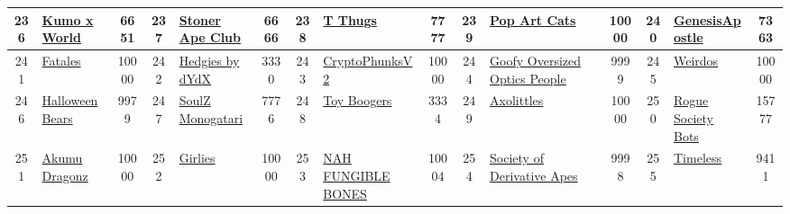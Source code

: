 \begin{table*}[]
{\begin{tabular}{|c|l|c|c|l|c|c|l|c|c|l|c|c|l|c|}
        236   & \href{https://kumoxworld.com/}{Kumo x World}                                       & 6651              & 237   & \href{https://thestonersclub.com}{Stoner Ape Club}                                                & 6666              & 238   & \href{https://www.trillionairethugs.com}{T Thugs}                                 & 7777              & 239   & \href{https://popartcats.xyz/}{Pop Art Cats}                                  & 10000             & 240   & \href{https://apostles.byopills.com}{GenesisApostle}                                      & 7363                                    \\ \hline
        241   & \href{http://ftlsnft.com}{Fatales}                                                 & 10000             & 242   & \href{https://hedgies.wtf}{Hedgies by dYdX}                                                       & 3330              & 243   & \href{https://www.cryptophunks.com}{CryptoPhunksV2}                               & 10000             & 244   & \href{http://wiki.goopdao.com/}{Goofy Oversized Optics People}                & 9999              & 245   & \href{https://www.ilikeyouyoureweird.com/}{Weirdos}                                       & 10000                                   \\ \hline
        246   & \href{https://halloweenbears.io/}{HalloweenBears}                                  & 9979              & 247   & \href{https://opensea.io/collection/soulz-monogatari7777}{SoulZ Monogatari}                       & 7776              & 248   & \href{https://toyboogers.io}{Toy Boogers}                                         & 3334              & 249   & \href{https://axolittles.io}{Axolittles}                                      & 10000             & 250   & \href{http://roguesociety.io}{Rogue Society Bots}                                         & 15777                                   \\ \hline
        251   & \href{https://akumudragonz.io}{Akumu Dragonz}                                      & 10000             & 252   & \href{https://girlies.art}{Girlies}                                                               & 10000             & 253   & \href{https://nahfungiblebones.com}{NAH FUNGIBLE BONES}                           & 10004             & 254   & \href{http://sodativity.io}{Society of Derivative Apes}                       & 9998              & 255   & \href{http://treeverse.net}{Timeless}                                                     & 9411                                    \\ \hline

\end{tabular}}
\end{table*}

